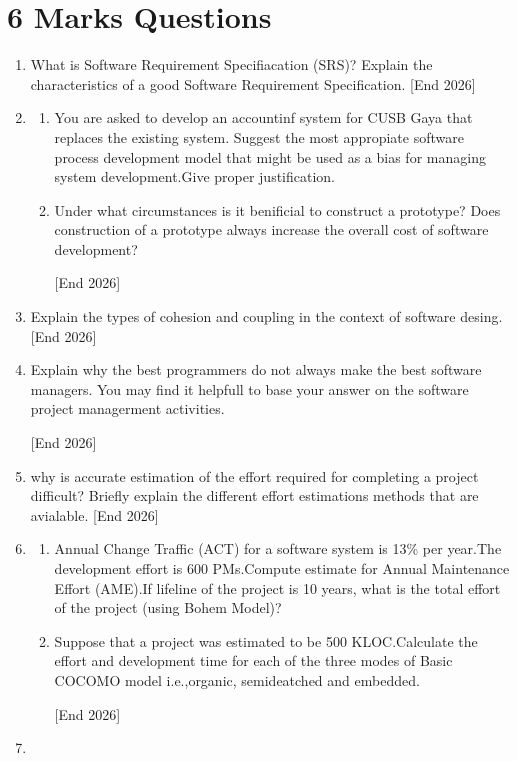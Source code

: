\documentclass[12pt,a4paper]{article}
\begin{document}
\section{6 Marks Questions}
\begin{enumerate}
    \item What is Software Requirement Specifiacation (SRS)? Explain the characteristics of a good Software Requirement Specification. \hfill [End 2026]
    \item \begin{enumerate}
        \item You are asked to develop an accountinf system for CUSB Gaya that replaces the existing system. Suggest the most appropiate software process development model that might be used as a bias for managing system development.Give proper justification.
        \item Under what circumstances is it benificial to construct a prototype? Does construction of a prototype always increase the overall cost of software development?
        

        \hfill [End 2026]
    \end{enumerate}
    \item Explain the types of cohesion and coupling in the context of software desing. \hfill [End 2026]
    \item Explain why the best programmers do not always make the best software managers. You may find it helpfull to base your answer on the software project managerment activities.

    \hfill [End 2026]

    \item why is accurate estimation of the effort required for completing a project difficult? Briefly explain the different effort estimations methods that are avialable. \hfill [End 2026]

    \item \begin{enumerate}
        \item Annual Change Traffic (ACT) for a software system is 13\% per year.The development effort is 600 PMs.Compute estimate for Annual Maintenance Effort (AME).If lifeline of the project is 10 years, what is the total effort of the project (using Bohem Model)?
        \item Suppose that a project was estimated to be 500 KLOC.Calculate the effort and development time for each of the three modes of Basic COCOMO model i.e.,organic, semideatched and embedded.


        \hfill [End 2026]
    \end{enumerate}
    \item 

\end{enumerate}
\end{document}
